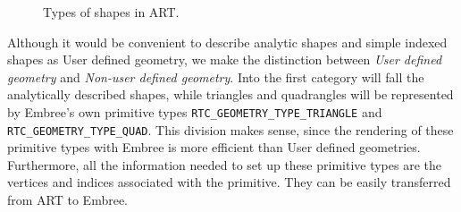 \begin{figure}[!tbp]
	\centering
	\hfill
	\hfill
	\caption{Types of shapes in ART.}
	\label{fig:shape_types}
\end{figure}

Although it would be convenient to describe analytic shapes and simple indexed shapes as User defined geometry, we make the distinction between \emph{User defined geometry} and \emph{Non-user defined geometry}. Into the first category will fall the analytically described shapes, while triangles and quadrangles will be represented by Embree's own primitive types \texttt{RTC\_GEOMETRY\_TYPE\_TRIANGLE} and \texttt{RTC\_GEOMETRY\_TYPE\_QUAD}. This division makes sense, since the rendering of these primitive types with Embree is more efficient than User defined geometries. Furthermore, all the information needed to set up these primitive types are the vertices and indices associated with the primitive. They can be easily transferred from ART to Embree. 

